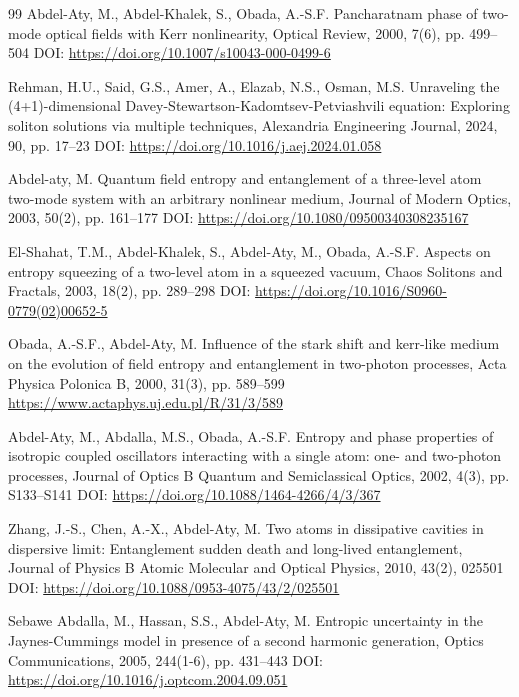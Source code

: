 \documentclass[10pt]{NSP1}
\begin{document}
	\begin{thebibliography}{99}
 Abdel-Aty, M., Abdel-Khalek, S., Obada, A.-S.F.
Pancharatnam phase of two-mode optical fields with Kerr nonlinearity, Optical Review, 2000, 7(6), pp. 499--504 DOI: \url{https://doi.org/10.1007/s10043-000-0499-6}

 Rehman, H.U., Said, G.S., Amer, A., Elazab, N.S., Osman, M.S.
Unraveling the (4+1)-dimensional Davey-Stewartson-Kadomtsev-Petviashvili equation: Exploring soliton solutions via multiple techniques, Alexandria Engineering Journal, 2024, 90, pp. 17--23 DOI: \url{https://doi.org/10.1016/j.aej.2024.01.058}

 Abdel-aty, M.
Quantum field entropy and entanglement of a three-level atom two-mode system with an arbitrary nonlinear medium, Journal of Modern Optics, 2003, 50(2), pp. 161--177 DOI: \url{https://doi.org/10.1080/09500340308235167}

 El-Shahat, T.M., Abdel-Khalek, S., Abdel-Aty, M., Obada, A.-S.F.
Aspects on entropy squeezing of a two-level atom in a squeezed vacuum, Chaos Solitons and Fractals, 2003, 18(2), pp. 289--298 DOI: \url{https://doi.org/10.1016/S0960-0779(02)00652-5}

 Obada, A.-S.F., Abdel-Aty, M.
Influence of the stark shift and kerr-like medium on the evolution of field entropy and entanglement in two-photon processes, Acta Physica Polonica B, 2000, 31(3), pp. 589--599 \url{https://www.actaphys.uj.edu.pl/R/31/3/589}

 Abdel-Aty, M., Abdalla, M.S., Obada, A.-S.F.
Entropy and phase properties of isotropic coupled oscillators interacting with a single atom: one- and two-photon processes, Journal of Optics B Quantum and Semiclassical Optics, 2002, 4(3), pp. S133--S141 DOI: \url{https://doi.org/10.1088/1464-4266/4/3/367}

 Zhang, J.-S., Chen, A.-X., Abdel-Aty, M.
Two atoms in dissipative cavities in dispersive limit: Entanglement sudden death and long-lived entanglement, Journal of Physics B Atomic Molecular and Optical Physics, 2010, 43(2), 025501 DOI: \url{https://doi.org/10.1088/0953-4075/43/2/025501}

 Sebawe Abdalla, M., Hassan, S.S., Abdel-Aty, M.
Entropic uncertainty in the Jaynes-Cummings model in presence of a second harmonic generation, Optics Communications, 2005, 244(1-6), pp. 431--443 DOI: \url{https://doi.org/10.1016/j.optcom.2004.09.051}


\end{thebibliography}
\end{document}
